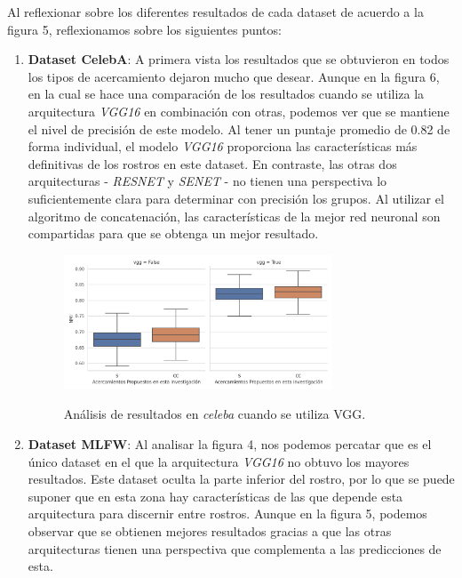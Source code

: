 \documentclass[letterpaper, 10 pt, conference]{ieeeconf}  %
\begin{document}
    Al reflexionar sobre los diferentes resultados de cada dataset de acuerdo a la
    figura 5, reflexionamos sobre los siguientes puntos:
    \begin{enumerate}
        \item \textbf{Dataset CelebA}: A primera vista los resultados que se obtuvieron en todos
            los tipos de acercamiento dejaron mucho que desear. Aunque en la
            figura 6, en la cual se hace una comparación de los resultados cuando se utiliza
            la arquitectura \textit{VGG16} en combinación con otras, podemos ver que se mantiene
            el nivel de precisión de este modelo. Al tener un puntaje promedio de 0.82 de forma
            individual, el modelo \textit{VGG16} proporciona las características más definitivas de
            los rostros en este dataset. En contraste, las otras dos arquitecturas -
            \textit{RESNET} y \textit{SENET} - no tienen una perspectiva lo suficientemente clara
            para determinar con precisión los grupos. Al utilizar el algoritmo de concatenación,
            las características de la mejor red neuronal son compartidas para que se obtenga un
            mejor resultado.
            \begin{figure}[ht]
                \centering
                \includegraphics[width=8cm]{./figs/celeba_vgg.png}
                \label{fig: Results Celeba with VGG}
                \caption{Análisis de resultados en \textit{celeba} cuando se utiliza VGG.}
            \end{figure}
        \item \textbf{Dataset MLFW}: Al analisar la figura 4, nos podemos percatar que es el único
            dataset en el que la arquitectura \textit{VGG16} no obtuvo los mayores resultados.
            Este dataset oculta la parte inferior del rostro, por lo que se puede suponer que en
            esta zona hay características de las que depende esta arquitectura para discernir entre
            rostros.  Aunque en la figura 5, podemos observar que se obtienen mejores resultados
            gracias a que las otras arquitecturas tienen una perspectiva que complementa a las
            predicciones de esta.
    \end{enumerate}
\end{document}

